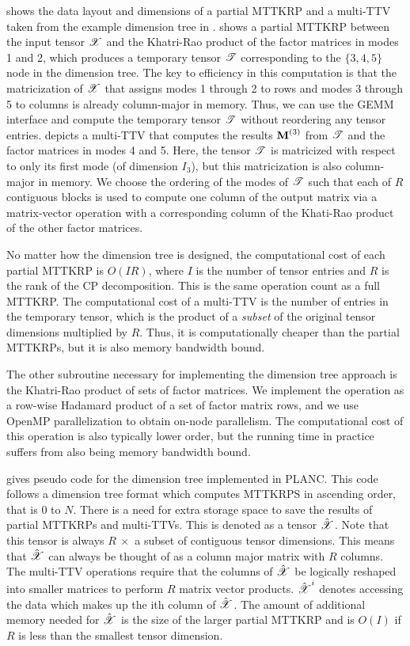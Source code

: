  shows the data layout and dimensions of a partial MTTKRP and a multi-TTV taken from the example dimension tree in .
 shows a partial MTTKRP between the input tensor $\T{X}$ and the Khatri-Rao product of the factor matrices in modes 1 and 2, which produces a temporary tensor $\T{T}$ corresponding to the $\{3,4,5\}$ node in the dimension tree.
The key to efficiency in this computation is that the matricization of $\T{X}$ that assigns modes 1 through 2 to rows and modes 3 through 5 to columns is already column-major in memory.
Thus, we can use the GEMM interface and compute the temporary tensor $\T{T}$ without reordering any tensor entries.
 depicts a multi-TTV that computes the results $\Mn{M}{3}$ from $\T{T}$ and the factor matrices in modes 4 and 5.
Here, the tensor $\T{T}$ is matricized with respect to only its first mode (of dimension $I_3$), but this matricization is also column-major in memory.
We choose the ordering of the modes of $\T{T}$ such that each of $R$ contiguous blocks is used to compute one column of the output matrix via a matrix-vector operation with a corresponding column of the Khati-Rao product of the other factor matrices.

No matter how the dimension tree is designed, the computational cost of each partial MTTKRP is $O(IR)$, where $I$ is the number of tensor entries and $R$ is the rank of the CP decomposition.
This is the same operation count as a full MTTKRP.
The computational cost of a multi-TTV is the number of entries in the temporary tensor, which is the product of a \emph{subset} of the original tensor dimensions multiplied by $R$.
Thus, it is computationally cheaper than the partial MTTKRPs, but it is also memory bandwidth bound.

The other subroutine necessary for implementing the dimension tree approach is the Khatri-Rao product of sets of factor matrices.
We implement the operation as a row-wise Hadamard product of a set of factor matrix rows, and we use OpenMP parallelization to obtain on-node parallelism.
The computational cost of this operation is also typically lower order, but the running time in practice suffers from also being memory bandwidth bound.

 gives pseudo code for the dimension tree implemented in PLANC. This code follows a dimension tree format which computes MTTKRPS in ascending order, that is 0 to $N$. There is a need for extra storage space to save the results of partial MTTKRPs and multi-TTVs. This is denoted as a tensor $\hat{\T{X}}$. Note that this tensor is always $R \ \times$ a subset of contiguous tensor dimensions. This means that $\hat{\T{X}}$ can always be thought of as a column major matrix with $R$ columns. The multi-TTV operations require that the columns of $\hat{\T{X}}$ be logically reshaped into smaller matrices to perform $R$ matrix vector products. $\hat{\T{X}}^i$ denotes accessing the data which makes up the ith column of $\hat{\T{X}}$. The amount of additional memory needed for $\hat{\T{X}}$  is the size of the larger partial MTTKRP and is $O(I)$ if $R$ is less than the smallest tensor dimension.


